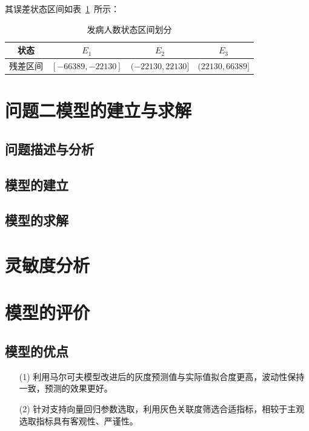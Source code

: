 \documentclass{whutmod}
\begin{document}
	    

	  其误差状态区间如表~\ref{ff}~所示：
	  	 \begin{table}[H]
	  	\centering\caption{发病人数状态区间划分}\label{ff}
	  	\begin{tabular}{cccc}
	  		\toprule[1.5pt]
	  		\multicolumn{1}{m{2cm}}{\centering 状态}
	  		& \multicolumn{1}{m{3cm}}{\centering $E_{1}$}
	  		& \multicolumn{1}{m{3cm}}{\centering $E_{2}$}
	  		& \multicolumn{1}{m{3cm}}{\centering $E_{3}$}
	  		\\
	  		\midrule[0.5pt]
	  		残差区间 &  $[-66389,-22130]$  &$(-22130,22130]$ & $(22130,66389]$   \\ 
	  		\bottomrule[1.5pt]	
	  	\end{tabular}
	  \end{table}  

	  
	  \section{问题二模型的建立与求解}
	  \subsection{问题描述与分析}

	
	  \subsection{模型的建立}
	  
	     
    \subsection{模型的求解}

 
  
  
  
  \section{灵敏度分析}
  
  
  
  \section{模型的评价}
  \subsection{模型的优点}
  \begin{itemize}                                             
  	\item [(1)] 利用马尔可夫模型改进后的灰度预测值与实际值拟合度更高，波动性保持一致，预测的效果更好。
  	\item [(2)] 针对支持向量回归参数选取，利用灰色关联度筛选合适指标，相较于主观选取指标具有客观性、严谨性。	
  \end{itemize}
\end{document}
